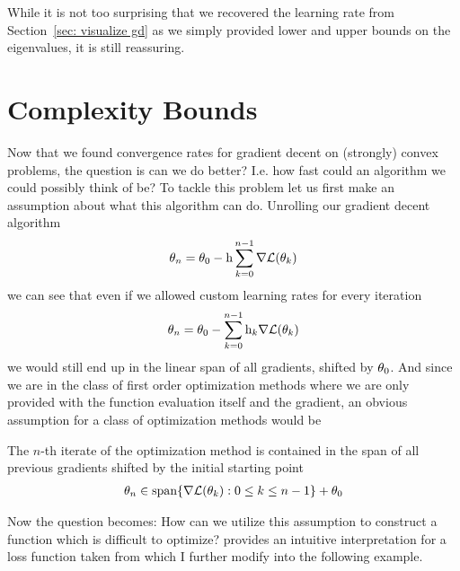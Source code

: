 While it is not too surprising that we recovered the learning rate from
Section~\ref{sec: visualize gd} as we simply provided lower and upper bounds on
the eigenvalues, it is still reassuring. 

\section{Complexity Bounds}

Now that we found convergence rates for gradient decent on (strongly) convex
problems, the question is can we do better? I.e. how fast could an algorithm we
could possibly think of be? To tackle this problem let us first make an
assumption about what this algorithm can do.
Unrolling our gradient decent algorithm
%
\begin{align*}
	\theta_n = \theta_0 - \text{h}\sum_{k=0}^{n-1} \nabla \mathcal{L}(\theta_k)
\end{align*}
%
we can see that even if we allowed custom learning rates for every iteration
%
\begin{align*}
	\theta_n = \theta_0 - \sum_{k=0}^{n-1} \text{h}_k \nabla \mathcal{L}(\theta_k)
\end{align*}
%
we would still end up in the linear span of all gradients, shifted by \(\theta_0\).
And since we are in the class of first order optimization methods where we are
only provided with the function evaluation itself and the gradient, an obvious
assumption for a class of optimization methods would be
%
\begin{assumption}
	\label{assmpt: parameter in linear hull of gradients}
	The \(n\)-th iterate of the optimization method is contained in the span of all
	previous gradients shifted by the initial starting point
	\begin{align*}
		\theta_n \in \text{span}\{\nabla \mathcal{L}(\theta_k) : 0\le k \le n-1\} + \theta_0
	\end{align*}
\end{assumption}
%
Now the question becomes: How can we utilize this assumption to construct a
function which is difficult to optimize?
\textcite{gohWhyMomentumReally2017} provides an intuitive interpretation for a loss
function taken from \textcite[Section 2.1.2]{nesterovLecturesConvexOptimization2018}
which I further modify into the following example.

